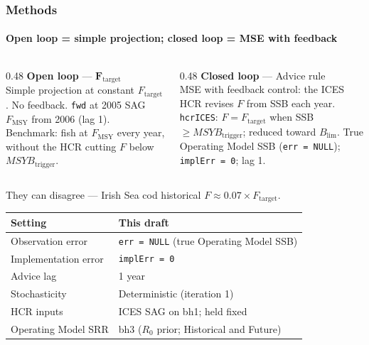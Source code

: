 \documentclass[
  aspectratio=169,
  t,
  onlytextwidth,
  10pt,
]{beamer}
\newcommand{\Fmsy}{F_{\mathrm{MSY}}}
\newcommand{\Ftar}{F_{\mathrm{target}}}
\newcommand{\Blim}{B_{\lim}}
\newcommand{\Btrig}{MSYB_{\mathrm{trigger}}}
\begin{document}
\begin{frame}
  \frametitle{Methods}
  \framesubtitle{Open loop = simple projection; closed loop = MSE with feedback}

  \begin{columns}[T]
    \begin{column}{0.48\linewidth}
      \textbf{Open loop} --- $\boldsymbol{F}_{\mathrm{target}}$\\[0.25em]
      {\small Simple projection at constant $F_{\mathrm{target}}$.
      No feedback. \texttt{fwd} at 2005 SAG $\Fmsy$ from 2006 (lag 1).
      Benchmark: fish at $\Fmsy$ every year, without the HCR cutting $F$
      below $\Btrig$.}
    \end{column}
    \begin{column}{0.48\linewidth}
      \textbf{Closed loop} --- Advice rule\\[0.25em]
      {\small MSE with feedback control: the ICES HCR revises $F$ from
      SSB each year. \texttt{hcrICES}: $F=\Ftar$ when SSB$\ge\Btrig$;
      reduced toward $\Blim$. True Operating Model SSB (\texttt{err = NULL});
      \texttt{implErr = 0}; lag 1.}
    \end{column}
  \end{columns}

  \vspace{0.35em}
  {\small They can disagree --- Irish Sea cod historical
  $F \approx 0.07\times F_{\mathrm{target}}$.}

  \vspace{0.35em}
  {\small
  \begin{tabular}{@{}ll@{}}
    \toprule
    Setting & This draft \\
    \midrule
    Observation error & \texttt{err = NULL} (true Operating Model SSB) \\
    Implementation error & \texttt{implErr = 0} \\
    Advice lag & 1 year \\
    Stochasticity & Deterministic (iteration 1) \\
    HCR inputs & ICES SAG on bh1; held fixed \\
    Operating Model SRR & bh3 ($R_0$ prior; Historical and Future) \\
    \bottomrule
  \end{tabular}}
\end{frame}
\end{document}

